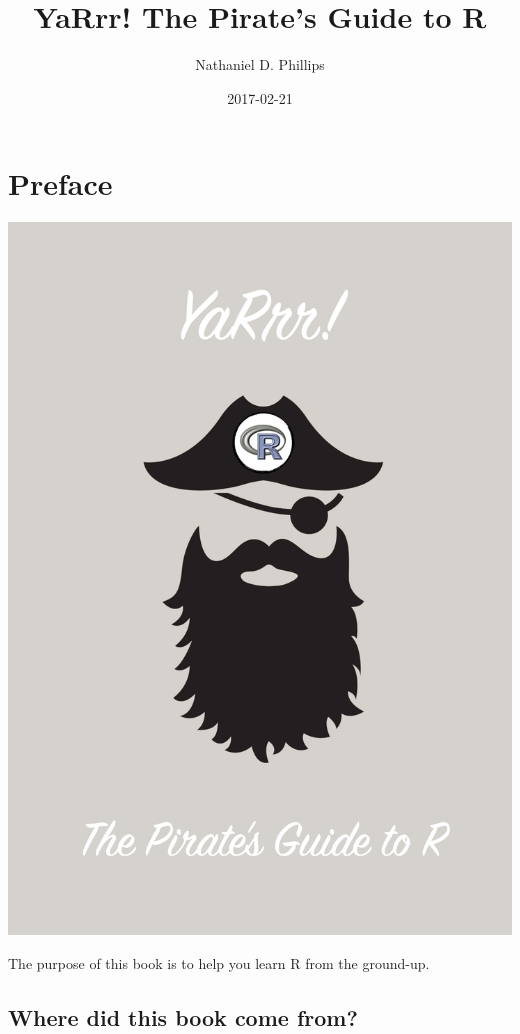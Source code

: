\documentclass[]{book}
\title{YaRrr! The Pirate's Guide to R}
\author{Nathaniel D. Phillips}
\date{2017-02-21}
\theoremstyle{definition}
\theoremstyle{definition}
\theoremstyle{remark}
\begin{document}
\maketitle

{
\setcounter{tocdepth}{1}
\tableofcontents
}
\chapter{Preface}\label{intro}

\begin{center}\includegraphics[width=600px]{images/YaRrr_Cover} \end{center}

The purpose of this book is to help you learn R from the ground-up.

\section{Where did this book come
from?}\label{where-did-this-book-come-from}
\end{document}
